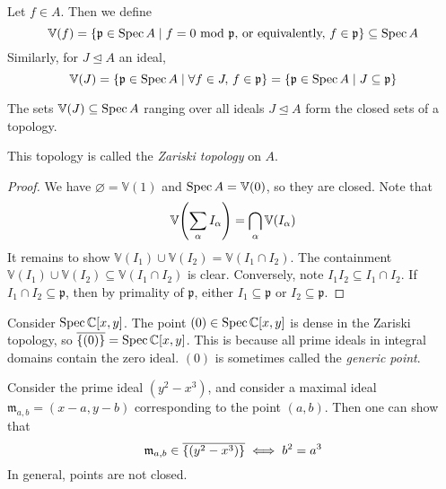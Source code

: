 \begin{definition}
    Let \( f \in A \).
    Then we define
    \[ \mathbb V(f) = \qty{\mathfrak p \in \operatorname{Spec}A \mid f = 0 \text{ mod } \mathfrak p \text{, or equivalently, } f \in \mathfrak p} \subseteq \operatorname{Spec} A \]
    Similarly, for \( J \trianglelefteq A \) an ideal,
    \[ \mathbb V(J) = \qty{\mathfrak p \in \operatorname{Spec}A \mid \forall f \in J,\, f \in \mathfrak p} = \qty{\mathfrak p \in \operatorname{Spec}A \mid J \subseteq \mathfrak p} \]
\end{definition}
\begin{proposition}
    The sets \( \mathbb V(J) \subseteq \operatorname{Spec} A \) ranging over all ideals \( J \trianglelefteq A \) form the closed sets of a topology.
\end{proposition}
This topology is called the \emph{Zariski topology} on \( A \).
\begin{proof}
    We have \( \varnothing = \mathbb V(1) \) and \( \operatorname{Spec} A = \mathbb V(0) \), so they are closed.
    Note that
    \[ \mathbb V\qty(\sum_\alpha I_\alpha) = \bigcap_\alpha \mathbb V(I_\alpha) \]
    It remains to show \( \mathbb V(I_1) \cup \mathbb V(I_2) = \mathbb V(I_1 \cap I_2) \).
    The containment \( \mathbb V(I_1) \cup \mathbb V(I_2) \subseteq \mathbb V(I_1 \cap I_2) \) is clear.
    Conversely, note \( I_1 I_2 \subseteq I_1 \cap I_2 \).
    If \( I_1 \cap I_2 \subseteq \mathfrak p \), then by primality of \( \mathfrak p \), either \( I_1 \subseteq \mathfrak p \) or \( I_2 \subseteq \mathfrak p \).
\end{proof}
\begin{example}
    Consider \( \operatorname{Spec} \mathbb C[x, y] \).
    The point \( (0) \in \operatorname{Spec} \mathbb C[x, y] \) is dense in the Zariski topology, so \( \overline{\qty{(0)}} = \operatorname{Spec} \mathbb C[x, y] \).
    This is because all prime ideals in integral domains contain the zero ideal.
    \( (0) \) is sometimes called the \emph{generic point}.

    Consider the prime ideal \( (y^2 - x^3) \), and consider a maximal ideal \( \mathfrak m_{a,b} = (x - a, y - b) \) corresponding to the point \( (a, b) \).
    Then one can show that
    \[ \mathfrak m_{a,b} \in \overline{\qty{(y^2 - x^3)}} \iff b^2 = a^3 \]
    In general, points are not closed.
\end{example}


